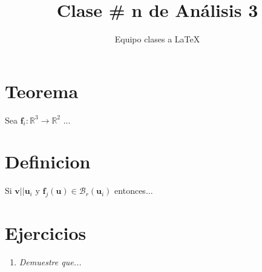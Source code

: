 \documentclass[12pt]{article}
\title{Clase \# n de Análisis 3}
\author{Equipo clases a \LaTeX}
\newcommand{\teorema}{\section{Teorema}}
\newcommand{\definicion}{\section{Definicion}}
\newcommand{\ejercicios}{\section{Ejercicios}}
\newcommand{\Rn}[1]{\mathbb{R}^{#1}}
\newcommand{\vect}[1]{\textbf{#1}}
\newcommand{\vecti}[2]{\textbf{#1}_{#2}}
\newcommand{\bola}[2]{\mathcal{B}_{#1}(#2)}
\begin{document}
	
	\maketitle
	\tableofcontents
	
	\teorema
	
	Sea $\vecti{f}{i}:\Rn{3} \rightarrow \Rn{2}$ ...
	
	\definicion
	
	Si $\vect{v} || \vecti{u}{i}$ y $\vecti{f}{j} (\vect{u}) \in \bola{r}{\vecti{u}{i}}$ entonces...
	
	\ejercicios
	
	\begin{enumerate}
		\item \textit{Demuestre que...}
	\end{enumerate}
	
\end{document}
